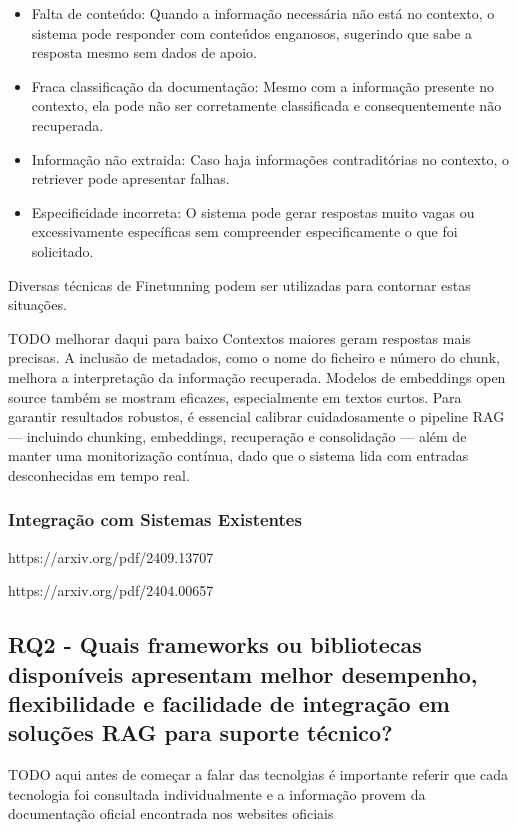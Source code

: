 \begin{itemize}
    \item Falta de conteúdo: Quando a informação necessária não está no contexto, o sistema pode responder com conteúdos enganosos, sugerindo que sabe a resposta mesmo sem dados de apoio.
    \item Fraca classificação da documentação: Mesmo com a informação presente no contexto, ela pode não ser corretamente classificada e consequentemente não recuperada. 
 \item Informação não extraida: Caso haja informações contraditórias no contexto, o retriever pode apresentar falhas.
  \item Especificidade incorreta: O sistema pode gerar respostas muito vagas ou excessivamente específicas sem compreender especificamente o que foi solicitado.
\end{itemize}

Diversas técnicas de Finetunning podem ser utilizadas para contornar estas situações.

TODO melhorar daqui para baixo
Contextos maiores geram respostas mais precisas. A inclusão de metadados, como o nome do ficheiro e número do chunk, melhora a interpretação da informação recuperada. Modelos de embeddings open source também se mostram eficazes, especialmente em textos curtos. Para garantir resultados robustos, é essencial calibrar cuidadosamente o pipeline RAG — incluindo chunking, embeddings, recuperação e consolidação — além de manter uma monitorização contínua, dado que o sistema lida com entradas desconhecidas em tempo real.



\subsubsection{Integração com Sistemas Existentes}




https://arxiv.org/pdf/2409.13707

https://arxiv.org/pdf/2404.00657


\subsection{RQ2 - Quais frameworks ou bibliotecas disponíveis apresentam melhor desempenho, flexibilidade e facilidade de integração em soluções RAG para suporte técnico?}


TODO aqui antes de começar a falar das tecnolgias é importante referir que cada tecnologia foi consultada individualmente e a informação provem da documentação oficial encontrada nos websites oficiais


